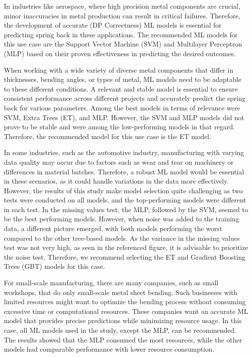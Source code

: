 In industries like aerospace, where high precision metal components are crucial, minor inaccuracies in metal production
can result in critical failures.
Therefore, the development of accurate (DP Correctness) ML models is essential for predicting spring
back in these applications.
The recommended ML models for this use case are the Support Vector Machine (SVM) and Multilayer Perceptron (MLP)
based on their proven effectiveness in predicting the desired outcomes.

When working with a wide variety of diverse metal components that differ in thicknesses, bending angles, or types of
metal, ML models need to be adaptable to these different conditions.
A relevant and stable model is essential to ensure consistent performance across different projects and accurately
predict the spring back for various parameters.
Among the best models in terms of relevance were SVM, Extra Trees (ET), and MLP.
However, the SVM and MLP models did not prove to be stable and were among the low-performing models in that regard.
Therefore, the recommended model for this use case is the ET model.

In some industries, such as the automotive industry, manufacturing with varying data quality may occur due to factors
such as wear and tear on machinery or differences in material batches.
Therefore, a robust ML model would be essential in these scenarios, as it could handle variations in the data more
effectively.
However, the results of this study make model selection quite challenging as two tests were conducted on all models,
and the top-performing models were different in each test.
In the missing values test, the MLP, followed by the SVM, seemed to be the best
performing models.
However, when noise was added to the training data, a different picture emerged, with both models
performing the worst compared to the other tree-based models.
As the variance in the missing values test was not very
high, as seen in the referenced figure, it is advisable to prioritize the noise test.
Therefore, we recommend selecting the ET and Gradient Boosting Trees (GBT) models for this case.

For small-scale manufacturing, there are many companies, such as small workshops, that do only small-scale metal
sheet bending.
Such businesses with limited resources might want to optimize the bending process without consuming
excessive time or computational resources.
These companies want an accurate ML model that provides precise predictions while minimizing resource usage.
In this case, all ML models used in the study, except the MLP, can be recommended.
The results showed that the MLP consumed the most resources, while the other models had comparable performance with
lower resource consumption.

